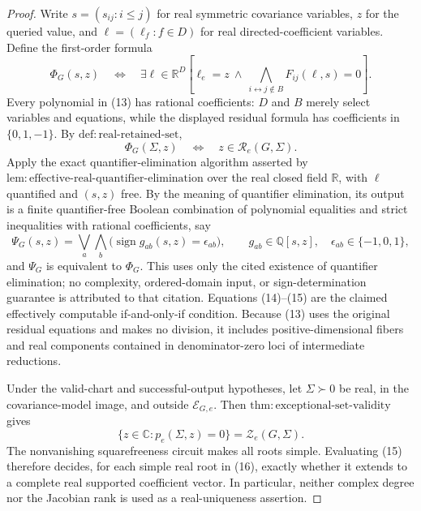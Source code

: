 \documentclass{article}
\begin{document}
\begin{proof}
Write \(s=(s_{ij}:i\leq j)\) for real symmetric covariance variables, \(z\) for the queried value, and \(\ell=(\ell_f:f\in D)\) for real directed-coefficient variables.  Define the first-order formula
\[
 \Phi_G(s,z)\quad\Longleftrightarrow\quad
 \exists\ell\in\mathbb R^D\left[
   \ell_e=z\ \wedge\
   \bigwedge_{i\leftrightarrow j\notin B}F_{ij}(\ell,s)=0
 \right].
\tag{13}
\]
Every polynomial in (13) has rational coefficients: \(D\) and \(B\) merely select variables and equations, while the displayed residual formula has coefficients in \(\{0,1,-1\}\).  By \(\mathrm{def:real\mbox{-}retained\mbox{-}set}\),
\[
 \Phi_G(\Sigma,z)\quad\Longleftrightarrow\quad
 z\in\mathcal R_e(G,\Sigma).
\tag{14}
\]
Apply the exact quantifier-elimination algorithm asserted by \(\mathrm{lem:effective\mbox{-}real\mbox{-}quantifier\mbox{-}elimination}\) over the real closed field \(\mathbb R\), with \(\ell\) quantified and \((s,z)\) free.  By the meaning of quantifier elimination, its output is a finite quantifier-free Boolean combination of polynomial equalities and strict inequalities with rational coefficients, say
\[
 \Psi_G(s,z)=\bigvee_a\bigwedge_b
 \bigl(\operatorname{sign}g_{ab}(s,z)=\epsilon_{ab}\bigr),
 \qquad
 g_{ab}\in\mathbb Q[s,z],\quad
 \epsilon_{ab}\in\{-1,0,1\},
\tag{15}
\]
and \(\Psi_G\) is equivalent to \(\Phi_G\).  This uses only the cited existence of quantifier elimination; no complexity, ordered-domain input, or sign-determination guarantee is attributed to that citation.  Equations (14)--(15) are the claimed effectively computable if-and-only-if condition.  Because (13) uses the original residual equations and makes no division, it includes positive-dimensional fibers and real components contained in denominator-zero loci of intermediate reductions.

Under the valid-chart and successful-output hypotheses, let \(\Sigma\succ0\) be real, in the covariance-model image, and outside \(\mathcal E_{G,e}\).  Then \(\mathrm{thm:exceptional\mbox{-}set\mbox{-}validity}\) gives
\[
 \{z\in\mathbb C:p_e(\Sigma,z)=0\}=\mathcal Z_e(G,\Sigma).
\tag{16}
\]
The nonvanishing squarefreeness circuit makes all roots simple.  Evaluating (15) therefore decides, for each simple real root in (16), exactly whether it extends to a complete real supported coefficient vector.  In particular, neither complex degree nor the Jacobian rank is used as a real-uniqueness assertion.


\end{proof}
\end{document}
